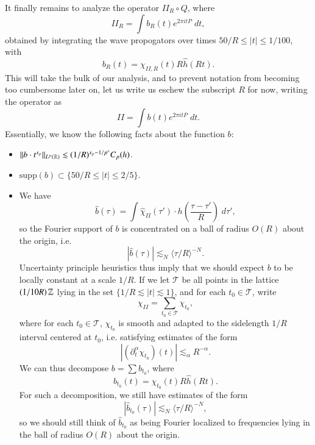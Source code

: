 It finally remains to analyze the operator $II_R \circ Q$, where
%
\[ II_R = \int b_R(t) e^{2 \pi i t P}\; dt, \] %
%
obtained by integrating the wave propogators over times $50/R \leq |t| \leq 1/100$, with
%
\[ b_R(t) = \chi_{II,R}(t) R \widehat{h}(Rt). \] %
%
This will take the bulk of our analysis, and to prevent notation from becoming too cumbersome later on, let us write us eschew the subscript $R$ for now, writing the operator as
%
\[ II = \int b(t) e^{2 \pi i t P}\; dt. \]
%
Essentially, we know the following facts about the function $b$:
%
\begin{itemize}
    \item $\| b \cdot t^{s_p} \|_{L^p(\operatorname{\mathbb{R}})} \lesssim (1/R)^{s_p - 1/p^*} C_p(h)$.

    \item $\text{supp}(b) \subset \{ 50/R \leq |t| \leq 2/5 \}$.

    \item We have
    \[ \widehat{b}(\tau) = \int \widehat{\chi}_{II}(\tau') \cdot h \left( \frac{\tau - \tau'}{R} \right)\; d\tau', \]
    so the Fourier support of $b$ is concentrated on a ball of radius $O(R)$ about the origin, i.e.
    \[ |\widehat{b}(\tau)| \lesssim_N \langle \tau / R \rangle^{-N}. \]
    Uncertainty principle heuristics thus imply that we should expect $b$ to be locally constant at a scale $1/R$. If we let $\mathcal{T}$ be all points in the lattice $(1/10R) \operatorname{\mathbb{Z}}$ lying in the set $\{ 1/R \lesssim |t| \lesssim 1 \}$, and for each $t_0 \in \mathcal{T}$, write
    \[ \chi_{II} = \sum_{t_0 \in \mathcal{T}} \chi_{t_0}, \]
    where for each $t_0 \in \mathcal{T}$, $\chi_{t_0}$ is smooth and adapted to the sidelength $1/R$ interval centered at $t_0$, i.e. satisfying estimates of the form
    \[ | (\partial_t^\alpha \chi_{t_0})(t) | \lesssim_\alpha R^{- \alpha}. \]
    We can thus decompose $b = \sum b_{t_0}$, where
    \[ b_{t_0}(t) = \chi_{t_0}(t) R \widehat{h}(Rt). \]
    For such a decomposition, we still have estimates of the form
    \[ |\widehat{b}_{t_0}(\tau)| \lesssim_N \langle \tau / R \rangle^{-N}, \]
    so we should still think of $\widehat{b}_{t_0}$ as being Fourier localized to frequencies lying in the ball of radius $O(R)$ about the origin.


\end{itemize}
